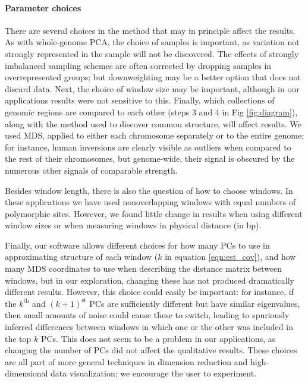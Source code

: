 \documentclass[11pt, oneside]{article}   	%
\newcommand\citep{\cite}
\newcommand{\Figure}{Fig }
\newcommand{\Figure}{{Figure }}
\renewcommand{\revpoint}[2]{\relax}
\begin{document}
\paragraph{Parameter choices}
There are several choices in the method that may in principle affect the results.
As with whole-genome PCA,
the choice of samples is important,
as variation not strongly represented in the sample will not be discovered.
The effects of strongly imbalanced sampling schemes are often corrected by dropping samples in overrepresented groups;
but downweighting may be a better option that does not discard data.
Next, the choice of window size may be important,
although in our applications results were not sensitive to this.
Finally, which collections of genomic regions are compared to each other (steps 3 and 4 in \Figure \ref{fig:diagram}),
along with the method used to discover common structure,
will affect results.
We used MDS, applied to either each chromosome separately or to the entire genome;
for instance, human inversions are clearly visible as outliers when compared to the rest of their chromosomes,
but genome-wide, their signal is obscured by the numerous other signals of comparable strength.

Besides window length, there is also the question of how to choose windows.
In these applications we have used nonoverlapping windows with equal numbers of polymorphic sites.
However, we found little change in results when using different window sizes
or when measuring windows in physical distance (in bp).


Finally, our software allows different choices for how many PCs to use in approximating structure of each window ($k$ in equation \ref{eqn:est_cov}),
and how many MDS coordinates to use when describing the distance matrix between windows,
but in our exploration, changing these has not produced dramatically different results.
However, this choice could easily be important:
for instance, if the $k^\text{th}$ and $(k+1)^\text{st}$ PCs 
are sufficiently different but have similar eigenvalues,
then small amounts of noise could cause these to switch,
leading to spuriously inferred differences between windows in which one or the other
was included in the top $k$ PCs.
This does not seem to be a problem in our applications,
as changing the number of PCs did not affect the qualitative results. \revpoint{2}{1}
These choices are all part of more general techniques in dimension reduction and high-dimensional data visualization;
we encourage the user to experiment.
\end{document}

